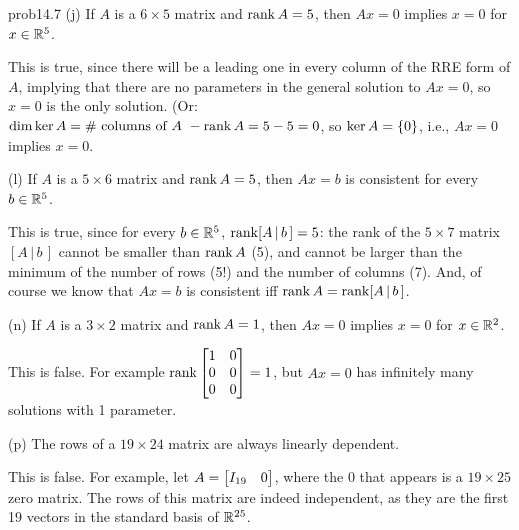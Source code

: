 \begin{sol}{prob14.7}
(j) If $A$ is a $6 \times 5$ matrix and $\operatorname{rank} A=5$, then $Ax=0$ implies $x=0$ for $x\in \mathbb{R}^5$.

\soln This is true, since there will be a leading one in every column of the RRE form of $A$, implying that there are no parameters in the general solution to $Ax=0$, so $x=0$ is the only solution. (Or: $\dim \ker A= \#\text{ columns of $A$ } -\operatorname{rank} A=5-5=0$, so $\ker A=\{0 \}$, i.e., $Ax=0$ implies $x=0$.
\medskip
%

(l) If $A$ is a $5 \times 6$ matrix and $\operatorname{rank} A=5$, then $Ax=b$ is consistent for every $b \in \mathbb{R}^5$.

\soln This is true, since  for every $b \in \mathbb{R}^5$,  $\operatorname{rank}  [A\,|\,b\,]=5$: the rank of the $5 \times 7$ matrix $[A\,|\,b\,]$ cannot be smaller than $\operatorname{rank} A$ (5), and cannot be larger than the minimum of the number of rows (5!) and the number of columns (7). And, of course we know that $Ax=b$ is consistent iff $\operatorname{rank} A=\operatorname{rank}  [A\,|\,b\,]$.
\medskip
%

(n) If $A$ is a $3 \times 2$ matrix and $\operatorname{rank} A=1$, then $Ax=0$ implies $x=0$ for $x\in \mathbb{R}^2$.

\soln This is false. For example $\rank \bmatrix 1 & 0  \\
 0 & 0 \\0 & 0 \endbmatrix=1
 $, but $Ax=0$ has infinitely many solutions with 1 parameter.
\medskip
%

(p) The rows of a $19 \times 24$ matrix are
always linearly dependent.

\soln This is false. For example, let $A= \bmatrix I_{19}&0\endbmatrix$, where the $0$ that appears is a $19 \times 25$ zero matrix. The rows of this matrix are indeed independent, as they are the first 19 vectors in the standard basis of $\mathbb{R}^{25}$.
\medskip




\end{sol}

